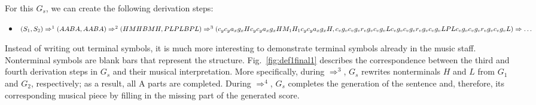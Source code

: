 For this $G_s$, we can create the following derivation steps:
\begin{itemize}
    \item{$(S_1, S_2) \Rightarrow^1 (AABA, AABA) \Rightarrow^2 (HMHBMH, PLPLBPL) 
    \\ \Rightarrow^3 (c_{y}c_{y}a_{x}g_{x}Hc_{y}c_{y}a_{x}g_{x}HM_1H_1c_{y}c_{y}a_{x}g_{x}H, 
    \\ c_{v}g_{v}c_{v}g_{v}r_{v}g_{v}c_{v}g_{v}Lc_{v}g_{v}c_{v}g_{v}r_{v}g_{v}c_{v}g_{v}LPLc_{v}g_{v}c_{v}g_{v}r_{v}g_{v}c_{v}g_{v}L)
    \\ \Rightarrow \hdots$}
\end{itemize}

Instead of writing out terminal symbols, it is much more interesting to demonstrate terminal symbols already in the music staff. Nonterminal symbols are blank bars that represent the structure. Fig.~\ref{fig:def1final1} describes the correspondence between the third and fourth derivation steps in $G_s$ and their musical interpretation. More specifically, during $\Rightarrow^3$, $G_s$ rewrites nonterminals $H$ and $L$ from $G_1$ and $G_2$, respectively; as a result, all A parts are completed.  During $\Rightarrow^4$, $G_s$ completes the generation of the sentence and, therefore, its corresponding musical piece by filling in the missing part of the generated score.

